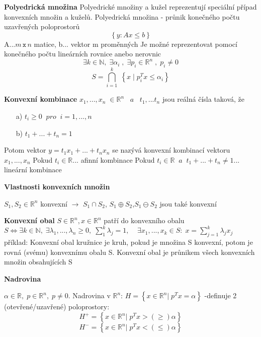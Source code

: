 \textbf{Polyedrická množina}
Polyedrické množiny a kužel reprezentují speciální případ konvexních množin a kuželů.
Polyedrická množina - průnik konečného počtu uzavřených poloprostorů 
$$\left \{ y: Ax\leq b \right \}$$
A...$m\, \texttt{x}\, n$ matice, b... vektor m proměnných
\newline Je možné reprezentovat pomocí konečného počtu lineárních rovnice anebo nerovnic
$$\exists k\in \mathbb{N},\; \exists \alpha _{i }\; ,\; \exists p_{i}\in \mathbb{R}^{n}\; ,\; p_{i}\neq 0$$
$$S=\bigcap_{i=1}^{k}\; \left \{ x\; |\; p_{i}^{T}x\leq \alpha _{i} \right \}$$

\textbf{Konvexní kombinace}
$x_{1},...,x_{n}\; \in \mathbb{R}^{n}\; \; \; a\; \; \; t_{1},...t_{n}$ jsou reálná čísla taková, že
\begin{enumerate}
\item[a)] $t_{i}\geq 0\; \; pro\; \; i=1,...,n$
\item[b)] $t_{1}+...+t_{n}=1$
\end{enumerate}
Potom vektor $ y=t_{1}x_{1}+...+t_{n}x_{n}$ se nazývá konvexní kombinací vektoru $x_{1},...,x_{n}$
Pokud $t_{i}\in \mathbb{R}$... afinní kombinace 
\newline Pokud $t_{i}\in \mathbb{R}\; \; a\; \; t_{1}+...+t_{n}\neq 1$... lineární kombinace

\textbf{Vlastnosti konvexních množin}

$S_{1},S_{2}\in \mathbb{R}^{n} $ konvexní $\rightarrow $ $S_{1}\cap S_{2}$, $S_{1}\oplus S_{2}$,$S_{1}\ominus S_{2}$ jsou také konvexní 

\textbf{Konvexní obal}
$S\in \mathbb{R}^{n},x\in \mathbb{R}^{n}$ patří do konvexního obalu $S\Leftrightarrow \exists k\in \mathbb{N},\; \exists \lambda _{1},...,\lambda _{n}\geq 0,\; \sum_{1}^{k}\lambda _{j}=1,\; \; \; \; \exists x_{1},...,x_{k}\in S:\; x=\sum_{j=1}^{k}\lambda _{j}x_{j}$ 
\newline příklad: Konvexní obal kružnice je kruh, pokud je množina S konvexní, potom je rovná (svému) konvexnímu obalu S.
\newline Konvexní obal je průnikem všech konvexních množin obsahujících S

\textbf{Nadrovina}

$\alpha \in \mathbb{R},\; p\in \mathbb{R}^{n},\; p\neq 0$. Nadrovina v $\mathbb{R}^{n} $: $H=\left \{ x\in \mathbb{R}^{n}|\; p^{T}x=\alpha  \right \} $
\newline -definuje 2 (otevřené/uzavřené) poloprostory:
$$H^{+}=\left \{ x\in \mathbb{R}^{n}|\; p^{T}x> (\geq )\alpha  \right \}$$
$$H^{-}=\left \{ x\in \mathbb{R}^{n}|\; p^{T}x< (\leq )\alpha  \right \}$$

